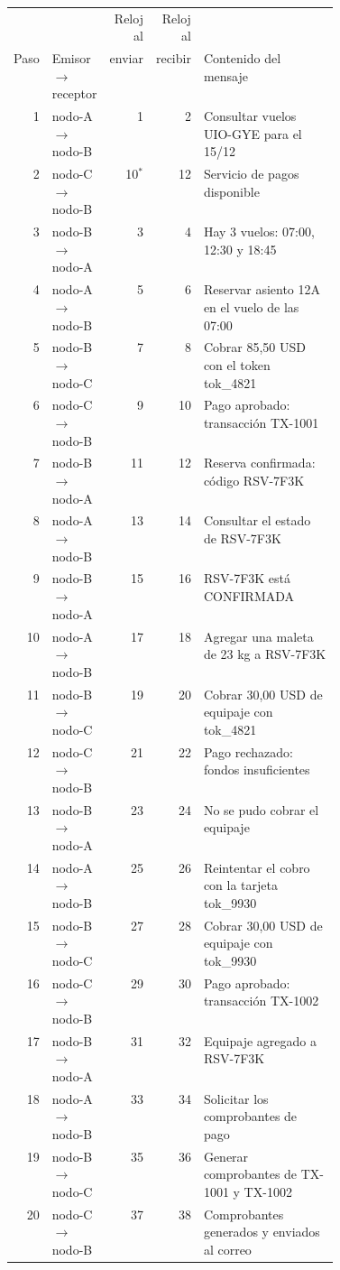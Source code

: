 \begin{tabular}{rlrrp{0.42\linewidth}}
\toprule
 & & Reloj al & Reloj al & \\
Paso & Emisor $\rightarrow$ receptor & enviar & recibir & Contenido del mensaje \\
\midrule
1 & nodo-A $\rightarrow$ nodo-B & 1 & 2 & Consultar vuelos UIO-GYE para el 15/12 \\
2 & nodo-C $\rightarrow$ nodo-B & 10$^{*}$ & 12 & Servicio de pagos disponible \\
3 & nodo-B $\rightarrow$ nodo-A & 3 & 4 & Hay 3 vuelos: 07:00, 12:30 y 18:45 \\
4 & nodo-A $\rightarrow$ nodo-B & 5 & 6 & Reservar asiento 12A en el vuelo de las 07:00 \\
5 & nodo-B $\rightarrow$ nodo-C & 7 & 8 & Cobrar 85,50 USD con el token tok\_4821 \\
6 & nodo-C $\rightarrow$ nodo-B & 9 & 10 & Pago aprobado: transacción TX-1001 \\
7 & nodo-B $\rightarrow$ nodo-A & 11 & 12 & Reserva confirmada: código RSV-7F3K \\
8 & nodo-A $\rightarrow$ nodo-B & 13 & 14 & Consultar el estado de RSV-7F3K \\
9 & nodo-B $\rightarrow$ nodo-A & 15 & 16 & RSV-7F3K está CONFIRMADA \\
10 & nodo-A $\rightarrow$ nodo-B & 17 & 18 & Agregar una maleta de 23 kg a RSV-7F3K \\
11 & nodo-B $\rightarrow$ nodo-C & 19 & 20 & Cobrar 30,00 USD de equipaje con tok\_4821 \\
12 & nodo-C $\rightarrow$ nodo-B & 21 & 22 & Pago rechazado: fondos insuficientes \\
13 & nodo-B $\rightarrow$ nodo-A & 23 & 24 & No se pudo cobrar el equipaje \\
14 & nodo-A $\rightarrow$ nodo-B & 25 & 26 & Reintentar el cobro con la tarjeta tok\_9930 \\
15 & nodo-B $\rightarrow$ nodo-C & 27 & 28 & Cobrar 30,00 USD de equipaje con tok\_9930 \\
16 & nodo-C $\rightarrow$ nodo-B & 29 & 30 & Pago aprobado: transacción TX-1002 \\
17 & nodo-B $\rightarrow$ nodo-A & 31 & 32 & Equipaje agregado a RSV-7F3K \\
18 & nodo-A $\rightarrow$ nodo-B & 33 & 34 & Solicitar los comprobantes de pago \\
19 & nodo-B $\rightarrow$ nodo-C & 35 & 36 & Generar comprobantes de TX-1001 y TX-1002 \\
20 & nodo-C $\rightarrow$ nodo-B & 37 & 38 & Comprobantes generados y enviados al correo \\
\bottomrule
\end{tabular}
